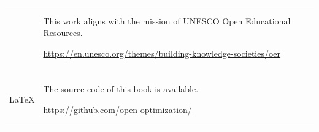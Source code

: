 \begin{tabular}{p{.3\linewidth}@{\qquad}p{.55\linewidth}}
\begin{minipage}[c]{\linewidth}
  \end{minipage}
  & \begin{minipage}[c]{\linewidth}
    This work aligns with the mission of UNESCO Open Educational
    Resources.\par\vspace{1ex}
    \raggedleft
    \url{https://en.unesco.org/themes/building-knowledge-societies/oer}
  \end{minipage}
  \\\\[2ex]
  \begin{minipage}[c]{\linewidth}
    \centering\LARGE\LaTeX
  \end{minipage}
  & \begin{minipage}[c]{\linewidth}
    The source code of this book is available.\par\vspace{1ex}
    \raggedleft
    \url{https://github.com/open-optimization/}
  \end{minipage}
\end{tabular}

\begin{center}
\end{center}

\newpage

%
%

